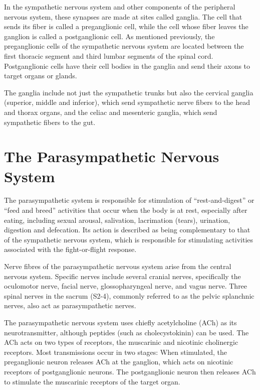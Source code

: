 In the sympathetic nervous system and other components of the peripheral nervous system, these synapses are made at sites called ganglia. The cell that sends its fiber is called a preganglionic cell, while the cell whose fiber leaves the ganglion is called a postganglionic cell. As mentioned previously, the preganglionic cells of the sympathetic nervous system are located between the first thoracic segment and third lumbar segments of the spinal cord. Postganglionic cells have their cell bodies in the ganglia and send their axons to target organs or glands.

The ganglia include not just the sympathetic trunks but also the cervical ganglia (superior, middle and inferior), which send sympathetic nerve fibers to the head and thorax organs, and the celiac and mesenteric ganglia, which send sympathetic fibers to the gut.

\hypertarget{the-parasympathetic-nervous-system}{%
\section{The Parasympathetic Nervous System}\label{the-parasympathetic-nervous-system}}

The parasympathetic system is responsible for stimulation of ``rest-and-digest'' or ``feed and breed'' activities that occur when the body is at rest, especially after eating, including sexual arousal, salivation, lacrimation (tears), urination, digestion and defecation. Its action is described as being complementary to that of the sympathetic nervous system, which is responsible for stimulating activities associated with the fight-or-flight response.

Nerve fibres of the parasympathetic nervous system arise from the central nervous system. Specific nerves include several cranial nerves, specifically the oculomotor nerve, facial nerve, glossopharyngeal nerve, and vagus nerve. Three spinal nerves in the sacrum (S2-4), commonly referred to as the pelvic splanchnic nerves, also act as parasympathetic nerves.

The parasympathetic nervous system uses chiefly acetylcholine (ACh) as its neurotransmitter, although peptides (such as cholecystokinin) can be used. The ACh acts on two types of receptors, the muscarinic and nicotinic cholinergic receptors. Most transmissions occur in two stages: When stimulated, the preganglionic neuron releases ACh at the ganglion, which acts on nicotinic receptors of postganglionic neurons. The postganglionic neuron then releases ACh to stimulate the muscarinic receptors of the target organ.


